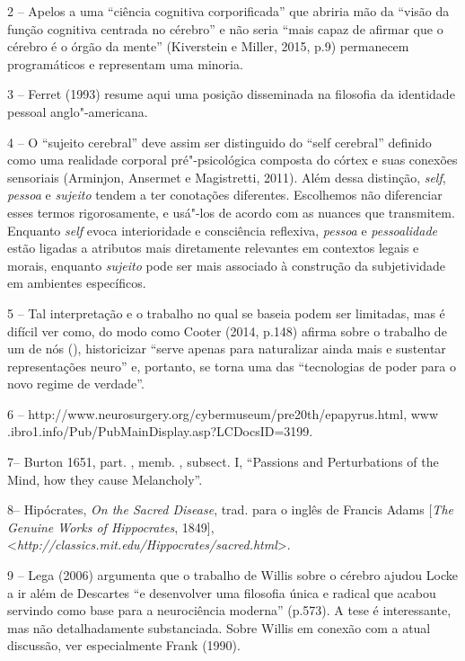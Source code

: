 2 -- Apelos a uma ``ciência cognitiva corporificada'' que abriria mão da
``visão da função cognitiva centrada no cérebro'' e não seria ``mais
capaz de afirmar que o cérebro é o órgão da mente'' (Kiverstein e
Miller, 2015, p.9) permanecem programáticos e representam uma minoria.

3 -- Ferret (1993) resume aqui uma posição disseminada na filosofia da
identidade pessoal anglo"-americana.

4 -- O ``sujeito cerebral'' deve assim ser distinguido do ``self
cerebral'' definido como uma realidade corporal pré"-psicológica composta
do córtex e suas conexões sensoriais (Arminjon, Ansermet e Magistretti,
2011). Além dessa distinção, \emph{self}, \emph{pessoa} e \emph{sujeito}
tendem a ter conotações diferentes. Escolhemos não diferenciar esses
termos rigorosamente, e usá"-los de acordo com as nuances que transmitem.
Enquanto \emph{self} evoca interioridade e consciência reflexiva,
\emph{pessoa} e \emph{pessoalidade} estão ligadas a atributos mais
diretamente relevantes em contextos legais e morais, enquanto
\emph{sujeito} pode ser mais associado à construção da subjetividade em
ambientes específicos.

5 -- Tal interpretação e o trabalho no qual se baseia podem ser
limitadas, mas é difícil ver como, do modo como Cooter (2014, p.148)
afirma sobre o trabalho de um de nós (), historicizar ``serve apenas
para naturalizar ainda mais e sustentar representações neuro'' e,
portanto, se torna uma das ``tecnologias de poder para o novo regime de
verdade''.

6 -- http://www.neurosurgery.org/cybermuseum/pre20th/epapyrus.html, www
.ibro1.info/Pub/PubMainDisplay.asp?LCDocsID=3199.

7-- Burton 1651, part. , memb. , subsect. I, ``Passions and
Perturbations of the Mind, how they cause Melancholy''.

8-- Hipócrates, \emph{On the Sacred Disease}, trad. para o inglês de
Francis Adams {[}\emph{The Genuine Works of Hippocrates}, 1849{]},
\textless{}\emph{http://classics.mit.edu/Hippocrates/sacred.html}\textgreater{}.

9 -- Lega (2006) argumenta que o trabalho de Willis sobre o cérebro
ajudou Locke a ir além de Descartes ``e desenvolver uma filosofia única
e radical que acabou servindo como base para a neurociência moderna''
(p.573). A tese é interessante, mas não detalhadamente substanciada.
Sobre Willis em conexão com a atual discussão, ver especialmente Frank
(1990).

